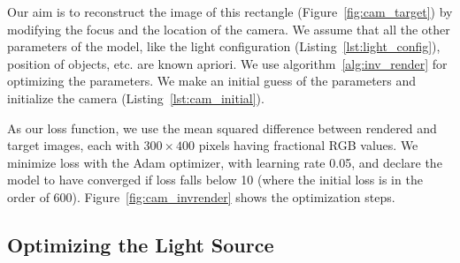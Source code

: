 \documentclass{juliacon}
\begin{document}
Our aim is to reconstruct the image of this rectangle (Figure~\ref{fig:cam_target}) by modifying the focus and the location of the camera. We assume that all the other parameters of the model, like the light configuration (Listing~\ref{lst:light_config}), position of objects, etc. are known apriori. We use algorithm~\ref{alg:inv_render} for optimizing the parameters. We make an initial guess of the parameters and initialize the camera (Listing~\ref{lst:cam_initial}).

As our loss function, we use the mean squared difference between rendered and target images, each with $300\times400$ pixels having fractional RGB values. We minimize loss with the Adam optimizer, with learning rate 0.05, and declare the model to have converged if loss falls below 10 (where the initial loss is in the order of 600). Figure~\ref{fig:cam_invrender} shows the optimization steps.

\subsection{Optimizing the Light Source}
\label{sec:light_source}
\end{document}
